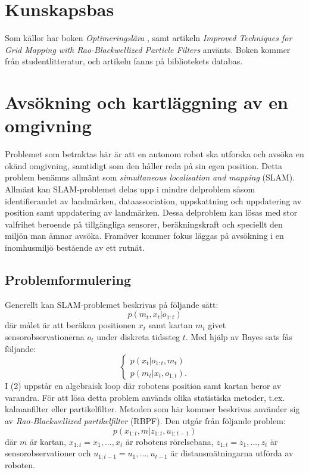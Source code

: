 \documentclass[12pt]{article}
\begin{document}
	\section{Kunskapsbas}
	Som källor har boken \textit{Optimeringslära} \autocite{lund-03}, samt artikeln \textit{Improved Techniques for Grid Mapping with Rao-Blackwellized Particle Filters} \autocite{gris-07} använts. Boken kommer från studentlitteratur, och artikeln fanns på bibliotekets databas.%
	
	\pagebreak
	
	\section{Avsökning och kartläggning av en omgivning} 
	
	
	Problemet som betraktas här är att en autonom robot ska utforska och avsöka en okänd omgivning, samtidigt som den håller reda på sin egen position. Detta problem benämns allmänt som \textit{simultaneous localisation and mapping} (SLAM). Allmänt kan SLAM-problemet delas upp i mindre delproblem såsom identifierandet av landmärken, dataassociation, uppskattning och uppdatering av position samt uppdatering av landmärken. Dessa delproblem kan lösas med stor valfrihet beroende på tillgängliga sensorer, beräkningskraft och speciellt den miljön man ämnar avsöka. Framöver kommer fokus läggas på avsökning i en inomhusmiljö bestående av ett rutnät. \autocite{gris-07}
	
	
	\subsection{Problemformulering}
	Generellt kan SLAM-problemet beskrivas på följande sätt:
	\begin{equation}
		p(m_{t},x_{t}|o_{1:t})
	\end{equation}
	där målet är att beräkna positionen $x_{t}$ samt kartan $m_{t}$ givet sensorobservationerna $o_{t}$ under diskreta tidssteg $t$. Med hjälp av Bayes sats fås följande:
	\begin{equation}
		\left\{\begin{matrix}
			p(x_{t}|o_{1:t},m_{t})\\
			p(m_{t}|x_{t},o_{1:t}).
		\end{matrix}\right.
	\end{equation}
	I (2) uppstår en algebraisk loop där robotens position samt kartan beror av varandra. För att lösa detta problem används olika statistiska metoder, t.ex. kalmanfilter eller partikelfilter. Metoden som här kommer beskrivas använder sig av \textit{Rao-Blackwellized partikelfilter} (RBPF). Den utgår från följande problem:
	\begin{equation}
		p(x_{1:t},m|z_{1:t},u_{1:t-1})
	\end{equation}
	där $m$ är kartan, $x_{1:t}=x_{1},...,x_{t}$ är robotens rörelsebana,  $z_{1:t}=z_{1},...,z_{t}$ är sensorobservationer och $u_{1:t-1}=u_{1},...,u_{t-1}$ är distansmätningarna utförda av roboten.
	
\end{document}
